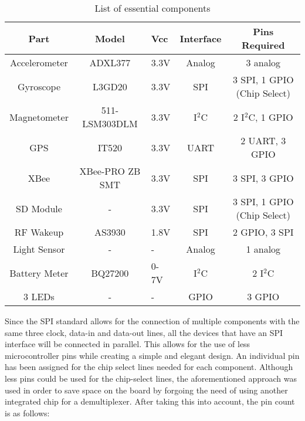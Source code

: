 \begin{table}[H]
\setlength{\extrarowheight}{1.5pt}
  \centering
  \caption{List of essential components}
    \begin{tabular}{|c|c|m{0.35in}|c|c|}
    \hline
    Part  & Model & \centering Vcc & Interface & Pins Required \\
    \hline \hline
    Accelerometer & ADXL377 & \centering 3.3V  & Analog & 3 analog \\ \hline
    Gyroscope & L3GD20 & \centering 3.3V  & SPI   & 3 SPI, 1 GPIO (Chip Select) \\ \hline
    Magnetometer & 511-LSM303DLM & \centering 3.3V  & I$^2$C   & 2 I$^2$C, 1 GPIO \\ \hline
    GPS   & IT520 & \centering 3.3V   & UART  & 2 UART, 3 GPIO \\ \hline 
    XBee  & XBee-PRO ZB SMT &\centering 3.3V  & SPI   & 3 SPI, 3 GPIO \\ \hline
    SD Module &   \centering -    & \centering 3.3V  & SPI   & 3 SPI, 1 GPIO (Chip Select) \\ \hline
    RF Wakeup & AS3930 & \centering 1.8V  & SPI   & 2 GPIO, 3 SPI \\ \hline
    Light Sensor & \centering - & \centering - & Analog & 1 analog \\ \hline
    Battery Meter & BQ27200 & 0-7V & \centering I$^2$C & 2 I$^2$C \\ \hline
    3 LEDs & \centering - & \centering - & GPIO & 3 GPIO \\ \hline
    
    \end{tabular}%
  \label{tab:componentPinCount}%
\end{table}%

Since the SPI standard allows for the connection of multiple components with the same three clock, data-in and data-out lines, all the devices that have an SPI interface will be connected in parallel.  This allows for the use of less microcontroller pins while creating a simple and elegant design.  An individual pin has been assigned for the chip select lines needed for each component.  Although less pins could be used for the chip-select lines, the aforementioned approach was used in order to save space on the board by forgoing the need of using another integrated chip for a demultiplexer.  After taking this into account, the pin count is as follows:

